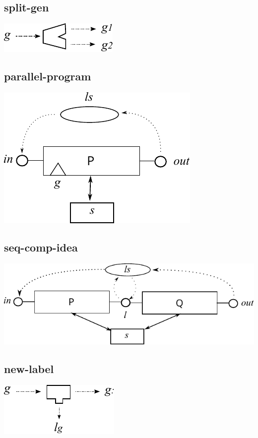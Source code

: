 \subsection{split-gen}
\includegraphics{images/split-gen}

\subsection{parallel-program}
\includegraphics{images/parallel-program}

\subsection{seq-comp-idea}
\includegraphics{images/seq-comp-idea}

\subsection{new-label}
\includegraphics{images/new-label}
